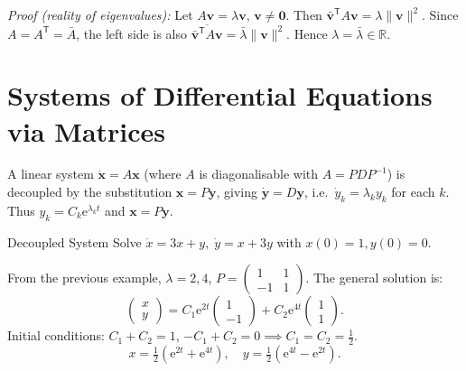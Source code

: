 \documentclass[12pt, a4paper]{book}
\newcommand{\R}{\mathbb{R}}
\newcommand{\e}{\mathrm{e}}
\newcommand{\trans}{^{\mathsf{T}}}
\newcommand{\inv}{^{-1}}
\renewcommand{\vec}[1]{\mathbf{#1}}
\begin{document}
\textit{Proof (reality of eigenvalues):} Let $A\vec{v}=\lambda\vec{v}$, $\vec{v}\neq\vec{0}$. Then $\bar{\vec{v}}\trans A\vec{v}=\lambda\|\vec{v}\|^2$. Since $A=A\trans=\bar{A}$, the left side is also $\overline{\bar{\vec{v}}\trans A\vec{v}}=\bar{\lambda}\|\vec{v}\|^2$. Hence $\lambda=\bar{\lambda}\in\R$.

\section{Systems of Differential Equations via Matrices}

A linear system $\dot{\vec{x}}=A\vec{x}$ (where $A$ is diagonalisable with $A=PDP\inv$) is decoupled by the substitution $\vec{x}=P\vec{y}$, giving $\dot{\vec{y}}=D\vec{y}$, i.e.\ $\dot{y}_k=\lambda_k y_k$ for each $k$. Thus $y_k=C_k\e^{\lambda_k t}$ and $\vec{x}=P\vec{y}$.

\begin{example}{Decoupled System}{}
Solve $\dot{x}=3x+y,\;\dot{y}=x+3y$ with $x(0)=1,y(0)=0$.

From the previous example, $\lambda=2,4$, $P=\begin{pmatrix}1&1\\-1&1\end{pmatrix}$. The general solution is:
\[
\begin{pmatrix}x\\y\end{pmatrix}=C_1\e^{2t}\begin{pmatrix}1\\-1\end{pmatrix}+C_2\e^{4t}\begin{pmatrix}1\\1\end{pmatrix}.
\]
Initial conditions: $C_1+C_2=1$, $-C_1+C_2=0\implies C_1=C_2=\tfrac{1}{2}$.
\[
x=\tfrac{1}{2}(\e^{2t}+\e^{4t}),\quad y=\tfrac{1}{2}(\e^{4t}-\e^{2t}).
\]
\end{example}
\end{document}
